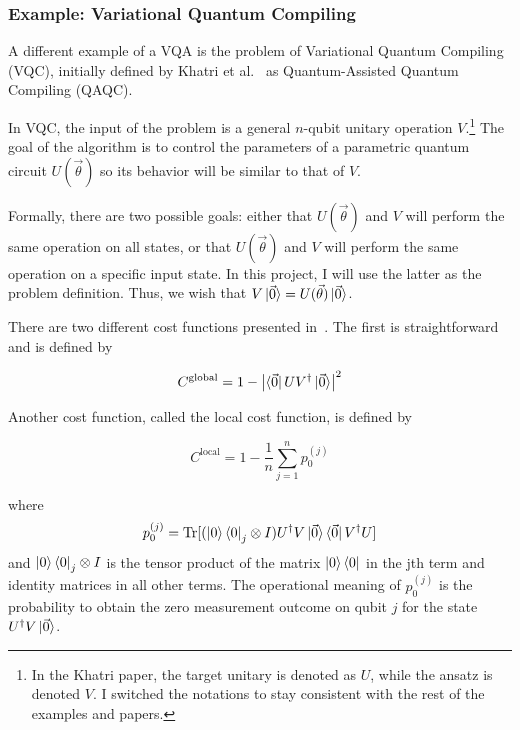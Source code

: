 \documentclass[a4paper,12pt]{article}
\newcommand{\thetas}{\vec{\theta}}
\DeclareMathOperator{\tr}{Tr}
\begin{document}
\subsubsection{Example: Variational Quantum Compiling} \label{subsec:vqc}
A different example of a VQA is the problem of Variational Quantum Compiling (VQC), initially defined by Khatri et al.~\cite{khatri_quantum-assisted_2019} as Quantum-Assisted Quantum Compiling (QAQC).

In VQC, the input of the problem is a general $n$-qubit unitary operation $V$.\footnote{In the Khatri paper, the target unitary is denoted as $U$, while the ansatz is denoted $V$. I switched the notations to stay consistent with the rest of the examples and papers.} The goal of the algorithm is to control the parameters of a parametric quantum circuit $U(\thetas)$ so its behavior will be similar to that of $V$.

Formally, there are two possible goals: either that $U(\thetas)$ and $V$ will perform the same operation on all states, or that $U(\thetas)$ and $V$ will perform the same operation on a specific input state.
In this project, I will use the latter as the problem definition. Thus, we wish that $V\ket{\vec{0}} = U(\thetas)\ket{\vec{0}}$.

There are two different cost functions presented in~\cite{khatri_quantum-assisted_2019}.
The first is straightforward and is defined by

\begin{equation}
    C^{\textrm{global}} = 1 - \left|\bra{\vec{0}}UV^\dagger\ket{\vec{0}}\right|^2
\end{equation}

Another cost function, called the local cost function, is defined by 

\begin{equation}
    C^{\textrm{local}} = 1 - \frac{1}{n} \sum_{j=1}^{n} p_0^{(j)}
\end{equation}

where
\begin{equation} \label{eqn:local_vqc_cost}
    p_0^{(j)} = \tr[({\ket{0}\bra{0}}_j \otimes I) U^\dagger V \ket{\vec{0}}\bra{\vec{0}} V^\dagger U]
\end{equation}
and ${\ket{0}\bra{0}}_j \otimes I$ is the tensor product of the matrix $\ket{0}\bra{0}$ in the jth term and identity matrices in all other terms.
The operational meaning of $p_0^{(j)}$ is the probability to obtain the zero measurement outcome on qubit $j$ for the state $U^\dagger V\ket{\vec{0}}$.
\end{document}
